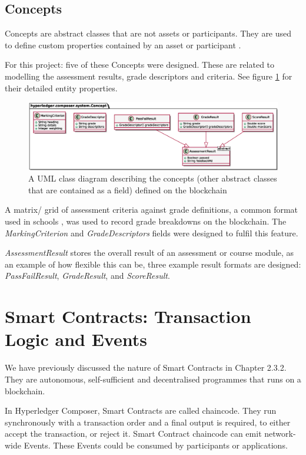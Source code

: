 \subsection{Concepts}

Concepts are abstract classes that are not assets or participants. They are used to define custom properties contained by an asset or participant \citep{official2018composer}.

For this project: five of these Concepts were designed. These are related to modelling the assessment results, grade descriptors and criteria.
See figure \ref{fig:concepts} for their detailed entity properties.

\begin{figure}[!ht]
	\centering
	\includegraphics[width=1.0\textwidth]{concepts}
	\caption[Concepts Class Diagram]
	{A UML class diagram describing the concepts (other abstract classes that are contained as a field) defined on the blockchain}
	\label{fig:concepts}
\end{figure}

A matrix/ grid of assessment criteria against grade definitions, a common format used in schools \citep[p.102]{bryan2006innovative},
was used to record grade breakdowns on the blockchain. The \textit{MarkingCriterion} and \textit{GradeDescriptors} fields were designed to
fulfil this feature.

\textit{AssessmentResult} stores the overall result of an assessment or course module, as an example of how flexible this can be,
three example result formats are designed: \textit{PassFailResult}, \textit{GradeResult}, and \textit{ScoreResult}.

\section{Smart Contracts: Transaction Logic and Events}

We have previously discussed the nature of Smart Contracts in Chapter 2.3.2. They are autonomous, self-sufficient and
decentralised programmes that runs on a blockchain.

In Hyperledger Composer, Smart Contracts are called chaincode.
They run synchronously with a transaction order and a final output is required, to either accept the transaction, or reject it.
Smart Contract chaincode can emit network-wide Events. These Events could be consumed by participants or applications.

